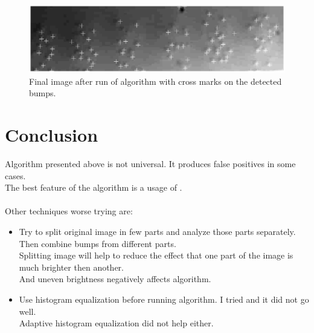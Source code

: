 \documentclass[letterpaper, 14pt]{article}
\begin{document}
\begin{figure}[!htbp]
	\centering
	\includegraphics[totalheight=3cm]{./images/04_FinalBumps.jpg}
	\caption{Final image after run of algorithm with cross marks on the detected bumps.}
	\label{fig:finalImage}
\end{figure}
\newpage

\section{Conclusion}
Algorithm presented above is not universal. It produces false positives in some cases.\\
The best feature of the algorithm is a usage of .\\\\
Other techniques worse trying are:
\begin{itemize}
	\item Try to split original image in few parts and analyze those parts separately.\\
	Then combine bumps from different parts.\\
	Splitting image will help to reduce the effect that one part of the image is much brighter then another.\\
	And uneven brightness negatively affects algorithm.
	\item Use histogram equalization before running algorithm. I tried and it did not go well.\\
	Adaptive histogram equalization did not help either.
\end{itemize}
\end{document}
